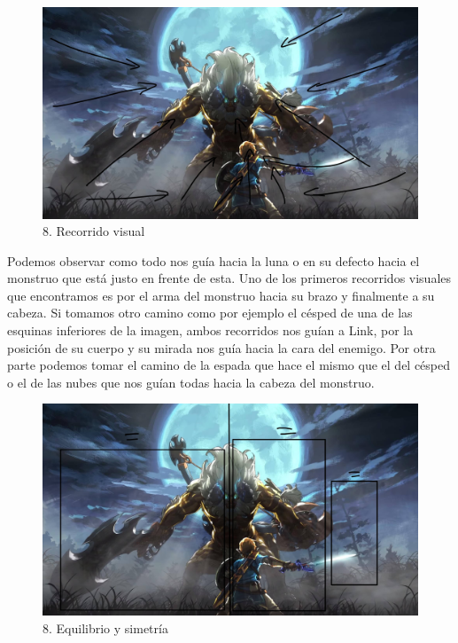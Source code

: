 \documentclass[12pt]{article}
\begin{document}
\begin{figure}[H]
      \centering
      \includegraphics[scale=0.25]{images/Raúl/Sección 8/Imagen 8 recorridos.jpg}
      \caption{\small 8. Recorrido visual}
    \end{figure}

Podemos observar como todo nos guía hacia la luna o en su defecto hacia el monstruo que está justo en frente de esta. Uno de los primeros recorridos visuales que encontramos es por el arma del monstruo hacia su brazo y finalmente a su cabeza. Si tomamos otro camino como por ejemplo el césped de una de las esquinas inferiores de la imagen, ambos recorridos nos guían a Link, por la posición de su cuerpo y su mirada nos guía hacia la cara del enemigo. Por otra parte podemos tomar el camino de la espada que hace el mismo que el del césped o el de las nubes que nos guían todas hacia la cabeza del monstruo.

\begin{figure}[H]
      \centering
      \includegraphics[scale=0.25]{images/Raúl/Sección 8/Imagen 8 regla pesos.jpg}
      \caption{\small 8. Equilibrio y simetría}
    \end{figure}
\end{document}
